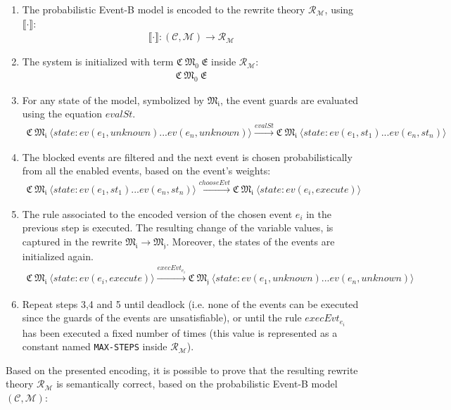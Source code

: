 \begin{enumerate}
    \item The probabilistic Event-B model is encoded to the rewrite theory $\mathscr{R}_\mathscr{M}$, using $\llbracket \cdot \rrbracket$:
    \begin{align*}
        \llbracket \cdot \rrbracket: (\mathscr{C}, \mathscr{M}) \rightarrow \mathscr{R}_\mathscr{M}
    \end{align*}
    \item The system is initialized with term $\mathfrak{C \ M_0 \ E}$ inside $\mathscr{R}_\mathscr{M}$:
    \begin{align*}
        \mathfrak{C \ M_0 \ E}
    \end{align*}
    \item For any state of the model, symbolized by $\mathfrak{M_i}$, the event guards are evaluated using the equation $evalSt$.
    \begin{align*}
        \mathfrak{C \ M_i} \ \langle state: ev(e_1,unknown) ... ev(e_n, unknown) \rangle \xrightarrow{evalSt} \mathfrak{C \ M_i} \ \langle state: ev(e_1,st_1) ... ev(e_n, st_n) \rangle
    \end{align*}
    \item The blocked events are filtered and the next event is chosen probabilistically from all the enabled events, based on the event's weights:
    \begin{align*}
        \mathfrak{C \ M_i} \ \langle state: ev(e_1,st_1) ... ev(e_n, st_n) \rangle \xrightarrow{chooseEvt} \mathfrak{C \ M_i} \ \langle state: ev(e_i,execute) \rangle
    \end{align*}
    \item The rule associated to the encoded version of the chosen event $e_i$ in the previous step is executed. The resulting change of the variable values, is captured in the rewrite $\mathfrak{M_i} \rightarrow \mathfrak{M_j}$. Moreover, the states of the events are initialized again. 
    \begin{align*}
        \mathfrak{C \ M_i} \ \langle state: ev(e_i,execute) \rangle \xrightarrow{execEvt_{e_i}} \mathfrak{C \ M_j} \ \langle state: ev(e_1,unknown) ... ev(e_n, unknown) \rangle
    \end{align*}
    \item Repeat steps 3,4 and 5 until deadlock (i.e. none of the events can be executed since the guards of the events are unsatisfiable), or until the rule $execEvt_{e_i}$ has been executed a fixed number of times (this value is represented as a constant named \texttt{MAX-STEPS} inside $\mathscr{R}_\mathscr{M}$).
\end{enumerate}
Based on the presented encoding, it is possible to prove that the resulting rewrite theory $\mathscr{R}_\mathscr{M}$ is semantically correct, based on the probabilistic Event-B model $(\mathscr{C}, \mathscr{M})$:

